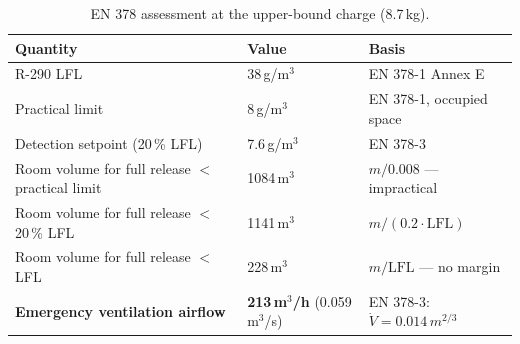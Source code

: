 \begin{table}[h!]
\caption{EN 378 assessment at the upper-bound charge (8.7\,kg).}
\label{tab:en378}
\begin{tabularx}{\linewidth}{lLL}
\toprule
\textbf{Quantity} & \textbf{Value} & \textbf{Basis} \\
\midrule
R-290 LFL & 38\,g/m$^3$ & EN 378-1 Annex E \\
Practical limit & 8\,g/m$^3$ & EN 378-1, occupied space \\
Detection setpoint (20\,\% LFL) & 7.6\,g/m$^3$ & EN 378-3 \\
\midrule
Room volume for full release $<$ practical limit & 1084\,m$^3$ & $m/0.008$ --- impractical \\
Room volume for full release $<$ 20\,\% LFL & 1141\,m$^3$ & $m/(0.2\cdot\mathrm{LFL})$ \\
Room volume for full release $<$ LFL & 228\,m$^3$ & $m/\mathrm{LFL}$ --- no margin \\
\midrule
\textbf{Emergency ventilation airflow} & \textbf{213\,m$^3$/h} (0.059\,m$^3$/s) & EN 378-3: $\dot V = 0.014\,m^{2/3}$ \\
\bottomrule
\end{tabularx}
\end{table}
